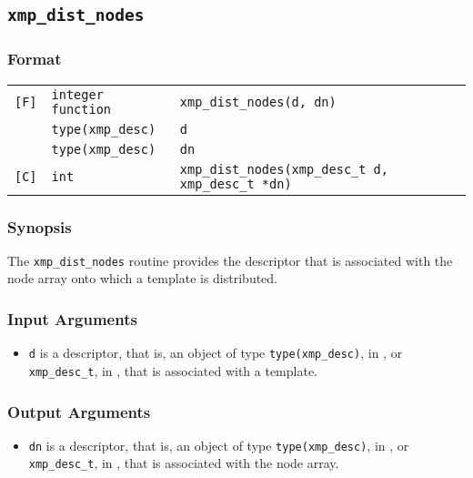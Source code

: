 \subsection{\tt xmp\_dist\_nodes}

\subsubsection*{Format}

\begin{tabular}{lll}

\verb![F]!& {\tt integer function}& {\tt xmp\_dist\_nodes(d, dn)}\\
          & {\tt type(xmp\_desc)} & {\tt d}\\
          & {\tt type(xmp\_desc)} & {\tt dn}\\

\verb![C]!&  {\tt int}& {\tt xmp\_dist\_nodes(xmp\_desc\_t d, xmp\_desc\_t *dn)}\\

\end{tabular}

\subsubsection*{Synopsis}

The {\tt xmp\_dist\_nodes} routine provides the descriptor that is 
associated with the node array onto which a template is distributed.


\subsubsection*{Input Arguments}
\begin{itemize}
 \item {\tt d} is a descriptor, that is, an object of type 
       {\tt type(xmp\_desc)}, in {\XMPF}, or {\tt xmp\_desc\_t},
       in {\XMPC}, that is associated with a template.
\end{itemize}

\subsubsection*{Output Arguments}
\begin{itemize}
 \item {\tt dn} is a descriptor, that is, an object of type 
       {\tt type(xmp\_desc)}, in {\XMPF}, or {\tt xmp\_desc\_t},
       in {\XMPC}, that is associated with the node array.
\end{itemize}


